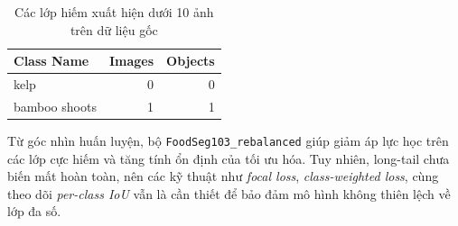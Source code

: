 \begin{table}[H]
    \centering
    \caption{Các lớp hiếm xuất hiện dưới 10 ảnh trên dữ liệu gốc}
    \begin{tabular}{lrr}
        \toprule
        Class Name & Images & Objects \\
        \midrule
        kelp & 0 & 0 \\
        bamboo shoots & 1 & 1 \\
        \bottomrule
    \end{tabular}
\end{table}

Từ góc nhìn huấn luyện, bộ \texttt{FoodSeg103\_rebalanced} giúp giảm áp lực học trên các lớp cực hiếm và tăng tính ổn định của tối ưu hóa. Tuy nhiên, long-tail chưa biến mất hoàn toàn, nên các kỹ thuật như \emph{focal loss}, \emph{class-weighted loss}, cùng theo dõi \emph{per-class IoU} vẫn là cần thiết để bảo đảm mô hình không thiên lệch về lớp đa số.
